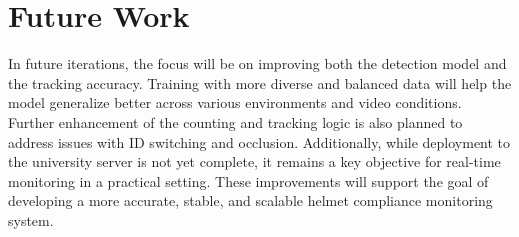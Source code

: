 \section{Future Work}
\setlength{\parindent}{2.5em}
In future iterations, the focus will be on improving both the detection model and the tracking accuracy. Training with more diverse and balanced data will help the model generalize better across various environments and video conditions. Further enhancement of the counting and tracking logic is also planned to address issues with ID switching and occlusion. Additionally, while deployment to the university server is not yet complete, it remains a key objective for real-time monitoring in a practical setting. These improvements will support the goal of developing a more accurate, stable, and scalable helmet compliance monitoring system.



